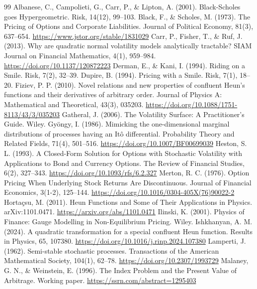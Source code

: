 \documentclass[a4paper,11pt]{article}
\begin{document}
\begin{thebibliography}{99}
 Albanese, C., Campolieti, G., Carr, P., \& Lipton, A. (2001). Black-Scholes goes Hypergeometric. Risk, 14(12), 99--103.
 Black, F., \& Scholes, M. (1973). The Pricing of Options and Corporate Liabilities. Journal of Political Economy, 81(3), 637--654. \url{https://www.jstor.org/stable/1831029}
 Carr, P., Fisher, T., \& Ruf, J. (2013). Why are quadratic normal volatility models analytically tractable? SIAM Journal on Financial Mathematics, 4(1), 959--984. \url{https://doi.org/10.1137/120872223}
 Derman, E., \& Kani, I. (1994). Riding on a Smile. Risk, 7(2), 32--39.
 Dupire, B. (1994). Pricing with a Smile. Risk, 7(1), 18--20.
 Fiziev, P. P. (2010). Novel relations and new properties of confluent Heun's functions and their derivatives of arbitrary order. Journal of Physics A: Mathematical and Theoretical, 43(3), 035203. \url{https://doi.org/10.1088/1751-8113/43/3/035203}
 Gatheral, J. (2006). The Volatility Surface: A Practitioner's Guide. Wiley.
 Gy\"{o}ngy, I. (1986). Mimicking the one-dimensional marginal distributions of processes having an It\^o differential. Probability Theory and Related Fields, 71(4), 501--516. \url{https://doi.org/10.1007/BF00699039}
 Heston, S. L. (1993). A Closed-Form Solution for Options with Stochastic Volatility with Applications to Bond and Currency Options. The Review of Financial Studies, 6(2), 327--343. \url{https://doi.org/10.1093/rfs/6.2.327}
 Merton, R. C. (1976). Option Pricing When Underlying Stock Returns Are Discontinuous. Journal of Financial Economics, 3(1-2), 125--144. \url{https://doi.org/10.1016/0304-405X(76)90022-2}
 Horta\c{c}su, M. (2011). Heun Functions and Some of Their Applications in Physics. arXiv:1101.0471. \url{https://arxiv.org/abs/1101.0471}
 Ilinski, K. (2001). Physics of Finance: Gauge Modelling in Non-Equilibrium Pricing. Wiley.
 Ishkhanyan, A. M. (2024). A quadratic transformation for a special confluent Heun function. Results in Physics, 65, 107380. \url{https://doi.org/10.1016/j.rinp.2024.107380}
 Lamperti, J. (1962). Semi-stable stochastic processes. Transactions of the American Mathematical Society, 104(1), 62--78. \url{https://doi.org/10.2307/1993729}
 Malaney, G. N., \& Weinstein, E. (1996). The Index Problem and the Present Value of Arbitrage. Working paper. \url{https://ssrn.com/abstract=1295403}

\end{thebibliography}
\end{document}
